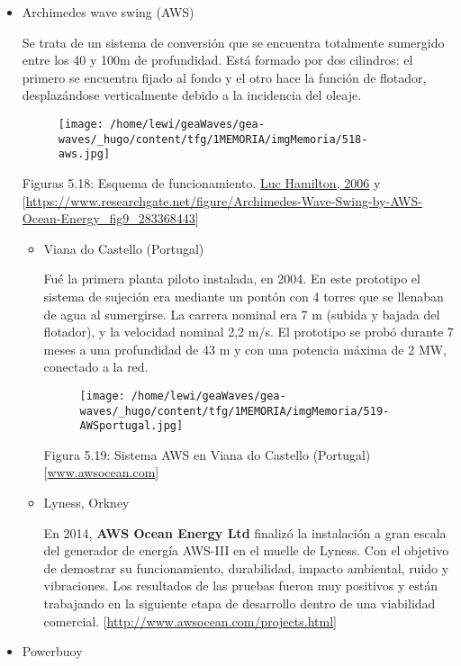 \begin{itemize}
\item
  Archimedes wave swing (AWS)

  Se trata de un sistema de conversión que se encuentra totalmente
  sumergido entre los 40 y 100m de profundidad. Está formado por dos
  cilindros: el primero se encuentra fijado al fondo y el otro hace la
  función de flotador, desplazándose verticalmente debido a la
  incidencia del oleaje.

  \begin{figure}
  \centering
  \texttt{[image: /home/lewi/geaWaves/gea-waves/\_hugo/content/tfg/1MEMORIA/imgMemoria/518-aws.jpg]}
  \caption{}
  \end{figure}

  Figuras 5.18: Esquema de funcionamiento. \href{www.awsocean.com}{Luc
  Hamilton, 2006} y
  {[}\url{https://www.researchgate.net/figure/Archimedes-Wave-Swing-by-AWS-Ocean-Energy_fig9_283368443}{]}

  \begin{itemize}
  \item
    Viana do Castello (Portugal)

    Fué la primera planta piloto instalada, en 2004. En este prototipo
    el sistema de sujeción era mediante un pontón con 4 torres que se
    llenaban de agua al sumergirse. La carrera nominal era 7 m (subida y
    bajada del flotador), y la velocidad nominal 2,2 m/s. El prototipo
    se probó durante 7 meses a una profundidad de 43 m y con una
    potencia máxima de 2 MW, conectado a la red.

    \begin{figure}
    \centering
    \texttt{[image: /home/lewi/geaWaves/gea-waves/\_hugo/content/tfg/1MEMORIA/imgMemoria/519-AWSportugal.jpg]}
    \caption{}
    \end{figure}

    Figura 5.19: Sistema AWS en Viana do Castello
    (Portugal){[}\url{www.awsocean.com}{]} 
  \item
    Lyness, Orkney

    En 2014, \textbf{AWS Ocean Energy Ltd} finalizó la instalación a
    gran escala del generador de energía AWS-III en el muelle de Lyness.
    Con el objetivo de demostrar su funcionamiento, durabilidad, impacto
    ambiental, ruido y vibraciones. Los resultados de las pruebas fueron
    muy positivos y están trabajando en la siguiente etapa de desarrollo
    dentro de una viabilidad comercial.
    {[}\url{http://www.awsocean.com/projects.html}{]}
  \end{itemize}
\item
  Powerbuoy


\end{itemize}
